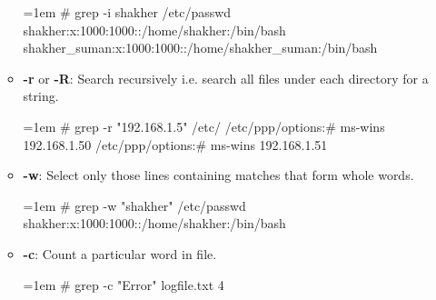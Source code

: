 \begin{flushleft}
\begin{itemize}
\begin{itemize}
			\begin{tcolorbox}[breakable,notitle,boxrule=-0pt,colback=black,colframe=black]
				\color{green}
				\font=1em
				\# grep -i shakher /etc/passwd
				\newline
				\color{white}
				shakher:x:1000:1000::/home/shakher:/bin/bash
				\newline
				shakher\_suman:x:1000:1000::/home/shakher\_suman:/bin/bash
				\font=4pt
			\end{tcolorbox}
			
			\item \textbf{-r} or \textbf{-R}: Search recursively i.e. search all files under each directory for a string.
			\bigskip
			\begin{tcolorbox}[breakable,notitle,boxrule=-0pt,colback=black,colframe=black]
				\color{green}
				\font=1em
				\# grep -r "192.168.1.5" /etc/
				\newline
				\color{white}
				/etc/ppp/options:\# ms-wins 192.168.1.50
				\newline
				/etc/ppp/options:\# ms-wins 192.168.1.51
				\font=4pt
			\end{tcolorbox}
			
			\item \textbf{-w}: Select only those lines containing matches that form whole words.
			\bigskip
			\begin{tcolorbox}[breakable,notitle,boxrule=-0pt,colback=black,colframe=black]
				\color{green}
				\font=1em
				\# grep -w "shakher" /etc/passwd
				\newline
				\color{white}
				shakher:x:1000:1000::/home/shakher:/bin/bash
				\font=4pt
			\end{tcolorbox}

			\item \textbf{-c}: Count a particular word in file.
			\bigskip
			\begin{tcolorbox}[breakable,notitle,boxrule=-0pt,colback=black,colframe=black]
				\color{green}
				\font=1em
				\# grep -c "Error" logfile.txt
				\newline
				\color{white}
				4
				\font=4pt
			\end{tcolorbox}
			

\end{itemize}
\end{itemize}
\end{flushleft}
